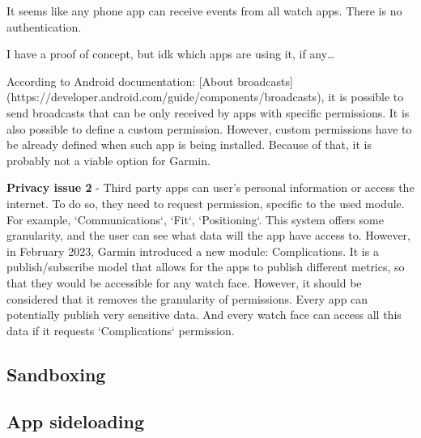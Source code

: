 It seems like any phone app can receive events from all watch apps.
There is no authentication.

I have a proof of concept, but idk which apps are using it, if any\ldots

According to Android documentation: [About broadcasts](https://developer.android.com/guide/components/broadcasts),
it is possible to send broadcasts that can be only received by apps with specific permissions.
It is also possible to define a custom permission.
However, custom permissions have to be already defined when such app is being installed.
Because of that, it is probably not a viable option for Garmin.


\textbf{Privacy issue 2} - Third party apps can user's personal information or access the internet.
To do so, they need to request permission, specific to the used module.
For example, `Communications`, `Fit`, `Positioning`.
This system offers some granularity, and the user can see what data will the app have access to.
However, in February 2023, Garmin introduced a new module: Complications.
It is a publish/subscribe model that allows for the apps to publish different metrics, so that they would be accessible for any watch face.
However, it should be considered that it removes the granularity of permissions.
Every app can potentially publish very sensitive data.
And every watch face can access all this data if it requests `Complications` permission.

\subsection{Sandboxing}
\subsection{App sideloading}
